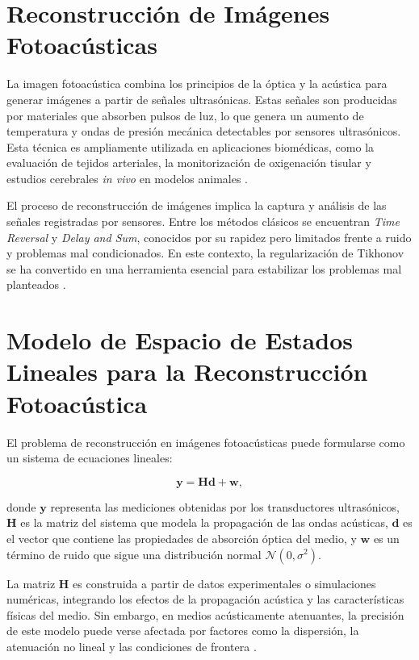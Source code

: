 
\section{Reconstrucción de Imágenes Fotoacústicas} \label{sec:lit:one}

La imagen fotoacústica combina los principios de la óptica y la acústica para generar imágenes a partir de señales ultrasónicas. Estas señales son producidas por materiales que absorben pulsos de luz, lo que genera un aumento de temperatura y ondas de presión mecánica detectables por sensores ultrasónicos. Esta técnica es ampliamente utilizada en aplicaciones biomédicas, como la evaluación de tejidos arteriales, la monitorización de oxigenación tisular y estudios cerebrales \textit{in vivo} en modelos animales \cite{Xu2015}.

El proceso de reconstrucción de imágenes implica la captura y análisis de las señales registradas por sensores. Entre los métodos clásicos se encuentran \textit{Time Reversal} y \textit{Delay and Sum}, conocidos por su rapidez pero limitados frente a ruido y problemas mal condicionados. En este contexto, la regularización de Tikhonov se ha convertido en una herramienta esencial para estabilizar los problemas mal planteados \cite{Tikhonov1963}.

\section{Modelo de Espacio de Estados Lineales para la Reconstrucción Fotoacústica} \label{sec:lit:two}

El problema de reconstrucción en imágenes fotoacústicas puede formularse como un sistema de ecuaciones lineales:

\begin{equation} \mathbf{y} = \mathbf{H} \mathbf{d} + \mathbf{w}, \end{equation}

donde $\mathbf{y}$ representa las mediciones obtenidas por los transductores ultrasónicos, $\mathbf{H}$ es la matriz del sistema que modela la propagación de las ondas acústicas, $\mathbf{d}$ es el vector que contiene las propiedades de absorción óptica del medio, y $\mathbf{w}$ es un término de ruido que sigue una distribución normal $\mathcal{N}(0, \sigma^2)$.

La matriz $\mathbf{H}$ es construida a partir de datos experimentales o simulaciones numéricas, integrando los efectos de la propagación acústica y las características físicas del medio. Sin embargo, en medios acústicamente atenuantes, la precisión de este modelo puede verse afectada por factores como la dispersión, la atenuación no lineal y las condiciones de frontera \cite{Lang2019}.

